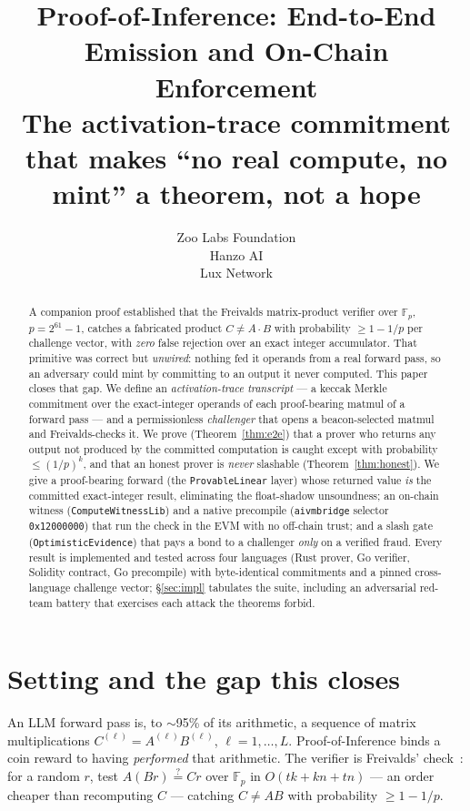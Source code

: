 \documentclass[11pt]{article}
\title{Proof-of-Inference: End-to-End Emission and On-Chain Enforcement\\
\large The activation-trace commitment that makes ``no real compute, no mint'' a theorem, not a hope}
\author{Zoo Labs Foundation \\ Hanzo AI \\ Lux Network}
\date{}
\newcommand{\Fp}{\mathbb{F}_p}
\begin{document}
\maketitle

\begin{abstract}
A companion proof established that the Freivalds matrix-product verifier over $\Fp$, $p=2^{61}-1$,
catches a fabricated product $C\neq A\cdot B$ with probability $\geq 1-1/p$ per challenge vector,
with \emph{zero} false rejection over an exact integer accumulator. That primitive was correct but
\emph{unwired}: nothing fed it operands from a real forward pass, so an adversary could mint by
committing to an output it never computed. This paper closes that gap. We define an
\emph{activation-trace transcript} --- a keccak Merkle commitment over the exact-integer operands of
each proof-bearing matmul of a forward pass --- and a permissionless \emph{challenger} that opens a
beacon-selected matmul and Freivalds-checks it. We prove (Theorem~\ref{thm:e2e}) that a prover who
returns any output not produced by the committed computation is caught except with probability
$\leq (1/p)^k$, and that an honest prover is \emph{never} slashable (Theorem~\ref{thm:honest}). We
give a proof-bearing forward (the \texttt{ProvableLinear} layer) whose returned value \emph{is} the
committed exact-integer result, eliminating the float-shadow unsoundness; an on-chain witness
(\texttt{ComputeWitnessLib}) and a native precompile (\texttt{aivmbridge} selector
\texttt{0x12000000}) that run the check in the EVM with no off-chain trust; and a slash gate
(\texttt{OptimisticEvidence}) that pays a bond to a challenger \emph{only} on a verified fraud. Every
result is implemented and tested across four languages (Rust prover, Go verifier, Solidity contract,
Go precompile) with byte-identical commitments and a pinned cross-language challenge vector;
\S\ref{sec:impl} tabulates the suite, including an adversarial red-team battery that exercises each
attack the theorems forbid.
\end{abstract}

\section{Setting and the gap this closes}

An LLM forward pass is, to $\sim$95\% of its arithmetic, a sequence of matrix multiplications
$C^{(\ell)} = A^{(\ell)} B^{(\ell)}$, $\ell = 1,\dots,L$. Proof-of-Inference binds a coin reward to
having \emph{performed} that arithmetic. The verifier is Freivalds' check~\cite{freivalds}: for a
random $r$, test $A(Br)\stackrel{?}{=}Cr$ over $\Fp$ in $O(tk+kn+tn)$ --- an order cheaper than
recomputing $C$ --- catching $C\neq AB$ with probability $\geq 1-1/p$.
\end{document}

